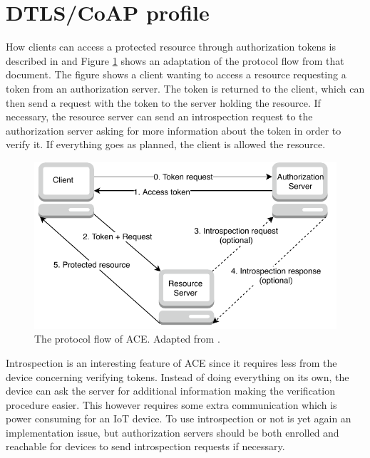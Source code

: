 \documentclass[0-thesis.tex]{subfiles}
\begin{document}
\label{chap:profiles}

\section{DTLS/CoAP profile}
\label{sec:dtls-coap-profile}
How clients can access a protected resource through authorization tokens is described in
\parencite{ace} and Figure \ref{fig:ace-flow} shows an adaptation of the protocol flow
from that document. The figure shows a client wanting to access a resource requesting a
token from an authorization server. The token is returned to the client, which can then
send a request with the token to the server holding the resource. If necessary, the
resource server can send an introspection request to the authorization server asking for
more information about the token in order to verify it. If everything goes as planned, the
client is allowed the resource.

\begin{figure}
    \caption{The protocol flow of ACE. Adapted from \parencite{ace}.}
    \label{fig:ace-flow}
    \includegraphics{images/ace.pdf}
\end{figure}

Introspection is an interesting feature of ACE since it requires less from the device
concerning verifying tokens. Instead of doing everything on its own, the device can ask
the server for additional information making the verification procedure easier. This
however requires some extra communication which is power consuming for an IoT device. To
use introspection or not is yet again an implementation issue, but authorization servers
should be both enrolled and reachable for devices to send introspection requests if
necessary.
\end{document}
